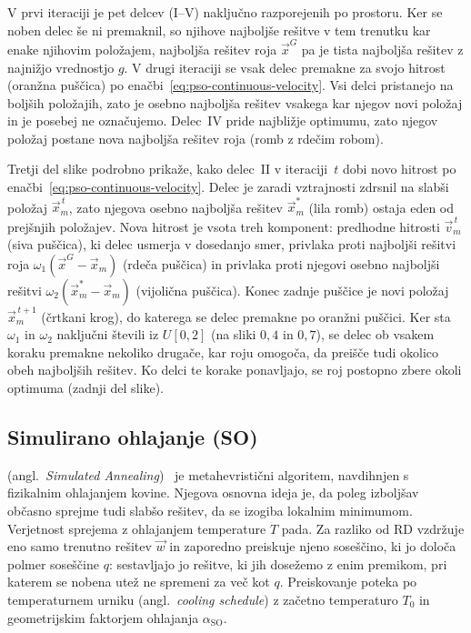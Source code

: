 \documentclass[9pt]{style/friteza}
\begin{document}
V prvi iteraciji je pet delcev (I--V) naključno razporejenih po prostoru. Ker se noben delec še ni premaknil, so njihove najboljše rešitve v tem trenutku kar enake njihovim položajem, najboljša rešitev roja $\vec{x}^{G}$ pa je tista najboljša rešitev z najnižjo vrednostjo $g$. V drugi iteraciji se vsak delec premakne za svojo hitrost (oranžna puščica) po enačbi~\eqref{eq:pso-continuous-velocity}. Vsi delci pristanejo na boljših položajih, zato je osebno najboljša rešitev vsakega kar njegov novi položaj in je posebej ne označujemo. Delec~IV pride najbližje optimumu, zato njegov položaj postane nova najboljša rešitev roja (romb z rdečim robom). 

Tretji del slike podrobno prikaže, kako delec~II v iteraciji~$t$ dobi novo hitrost po enačbi~\eqref{eq:pso-continuous-velocity}. Delec je zaradi vztrajnosti zdrsnil na slabši položaj $\vec{x}^{\,t}_{m}$, zato njegova osebno najboljša rešitev $\vec{x}^{\ast}_{m}$ (lila romb) ostaja eden od prejšnjih položajev. Nova hitrost je vsota treh komponent: predhodne hitrosti $\vec{v}^{\,t}_{m}$ (siva puščica), ki delec usmerja v dosedanjo smer, privlaka proti najboljši rešitvi roja $\omega_1(\vec{x}^{G}-\vec{x}_m)$ (rdeča puščica) in privlaka proti njegovi osebno najboljši rešitvi $\omega_2(\vec{x}^{\ast}_m-\vec{x}_m)$ (vijolična puščica). Konec zadnje puščice je novi položaj $\vec{x}^{\,t+1}_{m}$ (črtkani krog), do katerega se delec premakne po oranžni puščici. Ker sta $\omega_1$ in $\omega_2$ naključni števili iz $U[0,2]$ (na sliki $0{,}4$ in $0{,}7$), se delec ob vsakem koraku premakne nekoliko drugače, kar roju omogoča, da preišče tudi okolico obeh najboljših rešitev. Ko delci te korake ponavljajo, se roj postopno zbere okoli optimuma (zadnji del slike). 

\clearpage %
\subsection{Simulirano ohlajanje (SO)}\label{sec:so} (angl.\ \emph{Simulated Annealing})~\cite{kirkpatrick1983} je metahevristični algoritem, navdihnjen s fizikalnim ohlajanjem kovine. Njegova osnovna ideja je, da poleg izboljšav občasno sprejme tudi slabšo rešitev, da se izogiba lokalnim minimumom. Verjetnost sprejema z ohlajanjem temperature $T$ pada. Za razliko od RD vzdržuje eno samo trenutno rešitev $\vec{w}$ in zaporedno preiskuje njeno soseščino, ki jo določa polmer soseščine $q$: sestavljajo jo rešitve, ki jih dosežemo z enim premikom, pri katerem se nobena utež ne spremeni za več kot $q$. Preiskovanje poteka po temperaturnem urniku (angl.\ \emph{cooling schedule}) z začetno temperaturo $T_0$ in geometrijskim faktorjem ohlajanja $\alpha_{\mathrm{SO}}$.
\end{document}
